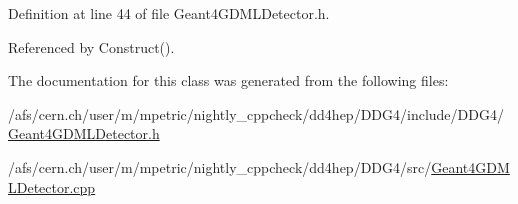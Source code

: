 Definition at line 44 of file Geant4\+G\+D\+M\+L\+Detector.\+h.



Referenced by Construct().



The documentation for this class was generated from the following files\+:\begin{DoxyCompactItemize}
\item 
/afs/cern.\+ch/user/m/mpetric/nightly\+\_\+cppcheck/dd4hep/\+D\+D\+G4/include/\+D\+D\+G4/\hyperlink{_geant4_g_d_m_l_detector_8h}{Geant4\+G\+D\+M\+L\+Detector.\+h}\item 
/afs/cern.\+ch/user/m/mpetric/nightly\+\_\+cppcheck/dd4hep/\+D\+D\+G4/src/\hyperlink{_geant4_g_d_m_l_detector_8cpp}{Geant4\+G\+D\+M\+L\+Detector.\+cpp}\end{DoxyCompactItemize}
